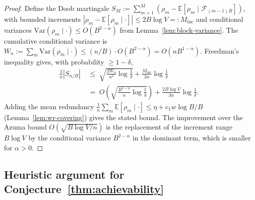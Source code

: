\documentclass[11pt]{article}
\newcommand{\E}{\mathbb{E}}
\newcommand{\F}{\mathcal{F}}
\theoremstyle{plain}
\theoremstyle{definition}
\theoremstyle{remark}
\begin{document}
\begin{proof}
Define the Doob martingale $S_M := \sum_{m=1}^M (\rho_m -
\E[\rho_m \mid \F_{(m-1)B}])$, with bounded increments
$|\rho_m - \E[\rho_m \mid \cdot]| \leq 2B\log V =: M_{\mathrm{inc}}$
and conditional variances $\mathrm{Var}(\rho_m \mid \cdot) \leq
O(B^{2-\alpha})$ from Lemma~\ref{lem:block-variance}. The
cumulative conditional variance is
$W_n := \sum_m \mathrm{Var}(\rho_m \mid \cdot) \leq (n/B) \cdot
O(B^{2-\alpha}) = O(n B^{1-\alpha})$. Freedman's inequality
\citep{freedman1975tail} gives, with probability $\geq 1-\delta$,
\[
\begin{split}
\frac1n|S_{n/B}|
&\;\leq\;
\sqrt{\frac{2 W_n}{n^2}\log\frac1\delta}
   + \frac{M_{\mathrm{inc}}}{3n}\log\frac1\delta\\
&\;=\;
O\!\left(\sqrt{\frac{B^{1-\alpha}}{n}\log\frac1\delta}\right)
   + \frac{2B\log V}{3n}\log\frac1\delta.
\end{split}
\]
Adding the mean redundancy
$\frac1n\sum_m \E[\rho_m \mid \cdot] \leq \eta + c_1 w\log B/B$
(Lemma~\ref{lem:wr-covering}) gives the stated bound. The
improvement over the Azuma bound
$O(\sqrt{B\log V/n})$ is the replacement of the increment range
$B\log V$ by the conditional variance $B^{2-\alpha}$ in the
dominant term, which is smaller for $\alpha > 0$.
\end{proof}

\subsection{Heuristic argument for Conjecture~\ref{thm:achievability}}
\end{document}

